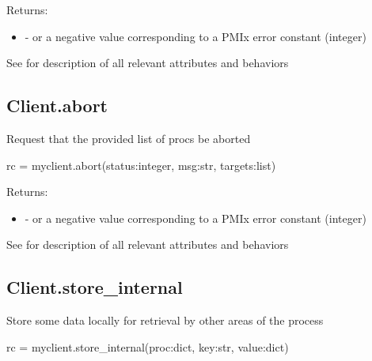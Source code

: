 Returns:

\begin{itemize}
    \item {} -  or a negative value corresponding to a PMIx error constant (integer)
\end{itemize}


See  for description of all relevant attributes and behaviors


\subsection{Client.abort}

\summary

Request that the provided list of procs be aborted

\format

\pyspecificstart
\begin{codepar}
rc = myclient.abort(status:integer, msg:str, targets:list)
\end{codepar}
\pyspecificend

\begin{arglist}
\end{arglist}

Returns:

\begin{itemize}
    \item {} -  or a negative value corresponding to a PMIx error constant (integer)
\end{itemize}


See  for description of all relevant attributes and behaviors


\subsection{Client.store_internal}

\summary

Store some data locally for retrieval by other areas of the process

\format

\pyspecificstart
\begin{codepar}
rc = myclient.store_internal(proc:dict, key:str, value:dict)
\end{codepar}
\pyspecificend

